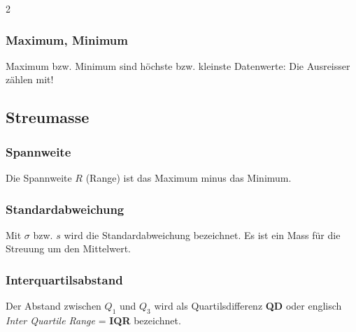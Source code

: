 \begin{multicols}{2}
\subsubsection*{Maximum, Minimum}

Maximum bzw. Minimum sind höchste bzw. kleinste Datenwerte: Die Ausreisser
zählen mit!

\headerUndFooterJedeSeite{}


\subsection*{Streumasse}
\subsubsection*{Spannweite}
Die Spannweite $R$ (Range) ist das Maximum minus
das Minimum.
\subsubsection*{Standardabweichung}
Mit $\sigma$ bzw. $s$ wird die Standardabweichung bezeichnet. Es ist
ein Mass für die Streuung um den Mittelwert.


\subsubsection*{Interquartilsabstand}
Der Abstand zwischen $Q_1$ und $Q_3$ wird als
Quartilsdifferenz \textbf{QD} oder
englisch \textit{Inter Quartile Range} = \textbf{IQR} bezeichnet.



\headerUndFooterJedeSeite{}

\end{multicols}
